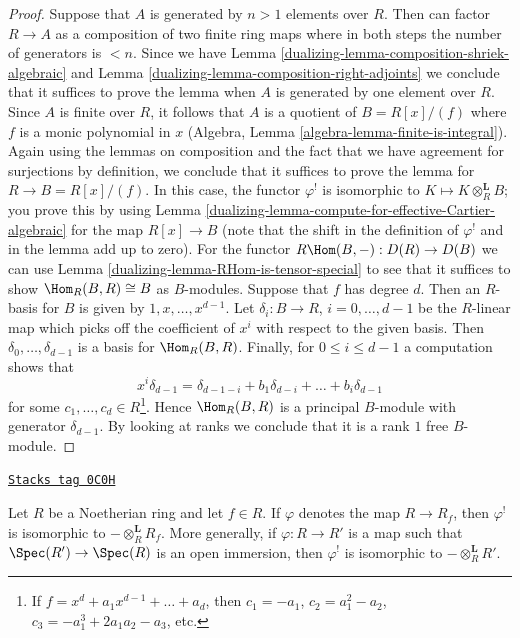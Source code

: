 \begin{proof}

Suppose that $A$ is generated by $n > 1$ elements over $R$.
Then can factor $R \to A$ as a composition of two finite ring maps
where in both steps the number of generators is $< n$.
Since we have Lemma \ref{dualizing-lemma-composition-shriek-algebraic} and
Lemma \ref{dualizing-lemma-composition-right-adjoints}
we conclude that it suffices
to prove the lemma when $A$ is generated by one element over $R$.
Since $A$ is finite over $R$, it follows that $A$ is a quotient
of $B = R[x]/(f)$ where $f$ is a monic polynomial in $x$
(Algebra, Lemma \ref{algebra-lemma-finite-is-integral}).
Again using the lemmas on composition and the fact that we
have agreement for surjections by definition, we conclude that
it suffices to prove the lemma for $R \to B = R[x]/(f)$.
In this case, the functor $\varphi^!$ is isomorphic to
$K \mapsto K \otimes_R^\mathbf{L} B$; you prove this by
using Lemma \ref{dualizing-lemma-compute-for-effective-Cartier-algebraic}
for the map $R[x] \to B$ (note that the shift in the definition
of $\varphi^!$ and in the lemma add up to zero).
For the functor $R\Hom(B, -) : D(R) \to D(B)$ we can use
Lemma \ref{dualizing-lemma-RHom-is-tensor-special}
to see that it suffices to show $\Hom_R(B, R) \cong B$
as $B$-modules. Suppose that $f$ has degree $d$.
Then an $R$-basis for $B$ is given by $1, x, \ldots, x^{d - 1}$.
Let $\delta_i : B \to R$, $i = 0, \ldots, d - 1$
be the $R$-linear map which picks off the coefficient
of $x^i$ with respect to the given basis. Then
$\delta_0, \ldots, \delta_{d - 1}$ is a basis for $\Hom_R(B, R)$.
Finally, for $0 \leq i \leq d - 1$ a computation shows that
$$
x^i \delta_{d - 1} =
\delta_{d - 1 - i} + b_1 \delta_{d - i} + \ldots + b_i \delta_{d - 1}
$$
for some $c_1, \ldots, c_d \in R$\footnote{If
$f = x^d + a_1 x^{d - 1} + \ldots + a_d$, then
$c_1 = -a_1$, $c_2 = a_1^2 - a_2$, $c_3 = -a_1^3 + 2a_1a_2 -a_3$, etc.}.
Hence $\Hom_R(B, R)$ is a principal $B$-module with generator
$\delta_{d - 1}$. By looking
at ranks we conclude that it is a rank $1$ free $B$-module.
\end{proof}

\begin{lemma}
\label{dualizing-lemma-upper-shriek-localize}
\href{https://stacks.math.columbia.edu/tag/0C0H}{\texttt{Stacks tag 0C0H}}

Let $R$ be a Noetherian ring and let $f \in R$.
If $\varphi$ denotes the map $R \to R_f$, then $\varphi^!$
is isomorphic to $- \otimes_R^\mathbf{L} R_f$.
More generally, if $\varphi : R \to R'$ is a map such that
$\Spec(R') \to \Spec(R)$ is an open immersion, then
$\varphi^!$ is isomorphic to $- \otimes_R^\mathbf{L} R'$.
\end{lemma}


